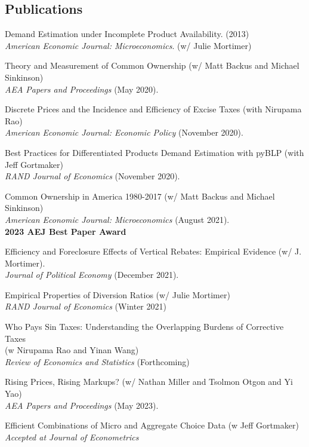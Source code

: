 \documentclass[letterpaper]{article}
\renewenvironment{itemize}{
  \begin{list}{}{
    \setlength{\leftmargin}{1.5em}
  }
}{
  \end{list}
}
\begin{document}
\subsection*{Publications}
\begin{itemize}
\item Demand Estimation under Incomplete Product Availability. (2013)\\
 \textit{American Economic Journal: Microeconomics}. (w/ Julie Mortimer)
\item Theory and Measurement of Common Ownership (w/ Matt Backus and Michael Sinkinson) \\\textit{AEA Papers and Proceedings} (May 2020).
\item Discrete Prices and the Incidence and Efficiency of Excise Taxes  (with Nirupama Rao)  \\\textit{American Economic Journal: Economic Policy} (November 2020). 
\item Best Practices for Differentiated Products Demand Estimation with pyBLP (with Jeff Gortmaker) \\\textit{RAND Journal of Economics} (November 2020).
\item Common Ownership in America 1980-2017 (w/ Matt Backus and Michael Sinkinson) \\\textit{American Economic Journal: Microeconomics} (August 2021).\\
\textbf{2023 AEJ Best Paper Award}\\
\item Efficiency and Foreclosure Effects of Vertical Rebates: Empirical Evidence (w/ J. Mortimer). \\\textit{Journal of Political Economy} (December 2021).
\item Empirical Properties of Diversion Ratios (w/ Julie Mortimer)\\\textit{RAND Journal of Economics} (Winter 2021)
\item Who Pays Sin Taxes: Understanding the Overlapping Burdens of Corrective Taxes\\
 (w Nirupama Rao and Yinan Wang) \\
 \textit{Review of Economics and Statistics} (Forthcoming)
 \item Rising Prices, Rising Markups? (w/ Nathan Miller and Tsolmon Otgon and Yi Yao)\\ 
 \textit{AEA Papers and Proceedings} (May 2023).
 \item Efficient Combinations of Micro and Aggregate Choice Data (w Jeff Gortmaker)  \\\textit{Accepted at Journal of Econometrics} 
\end{itemize}
\end{document}
